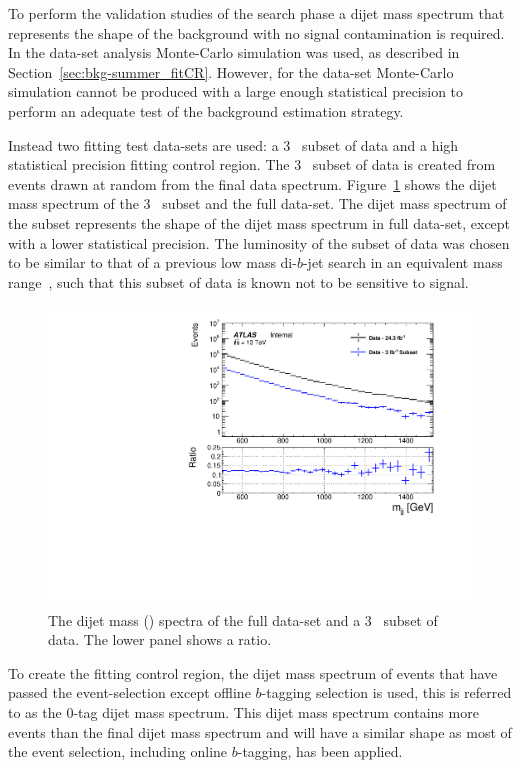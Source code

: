 To perform the validation studies of the \lm{} search phase
a dijet mass spectrum that represents the shape of the background with no signal contamination is required.
In the \summer{} data-set analysis Monte-Carlo simulation was used,
as described in Section~\ref{sec:bkg-summer_fitCR}.
However, for the \lm{} data-set  Monte-Carlo simulation cannot be produced with a large enough statistical
precision to perform an adequate test of the background estimation strategy.

Instead two fitting test data-sets are used:
a 3~\ifb{} subset of data and a high statistical precision fitting control region.
The 3~\ifb{} subset of data is created from events drawn at random from the final data spectrum.
Figure~\ref{fig:fittingDataSubset} shows the dijet mass spectrum of the 3~\ifb{} subset and the full \lm{} data-set.
The dijet mass spectrum of the subset represents the shape of the dijet mass spectrum in full data-set,
except with a lower statistical precision.
The luminosity of the subset of data was chosen to be similar to that of a
previous low mass di-$b$-jet search in an equivalent mass range~\cite{dibjet-lhcp_conf},
such that this subset of data is known not to be sensitive to signal.

\begin{figure}[!htb]
\captionsetup[subfigure]{aboveskip=0pt,justification=centering}
\centering
\includegraphics[width=0.7\linewidth, angle=0]{figs/Dibjet/LowMass/FitStudy/subset_dataComp.pdf}
\caption{\label{fig:fittingDataSubset}
  The dijet mass (\mjj{}) spectra of the full \lm{} data-set and a 3~\ifb{} subset of \lm{} data.
  The lower panel shows a ratio.}
\end{figure}

To create the \lm{} fitting control region,
the dijet mass spectrum of events that have passed the
\lm{} event-selection except offline $b$-tagging selection is used,
this is referred to as the 0-tag dijet mass spectrum.
This dijet mass spectrum contains more events than the final dijet mass spectrum
and will have a similar shape as most of the event selection, including online $b$-tagging, has been applied.

